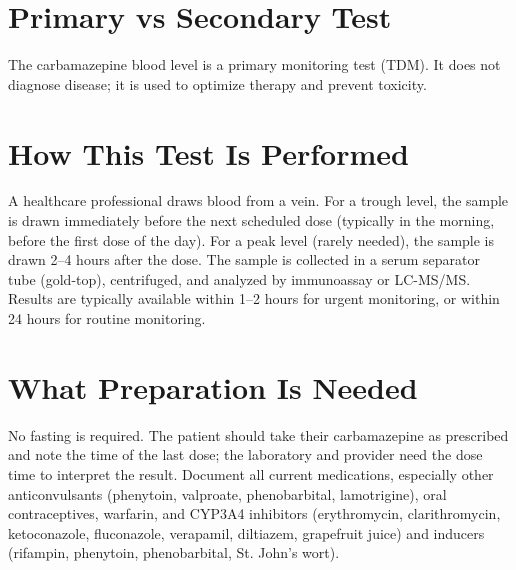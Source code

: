 \section*{Primary vs Secondary Test}
The carbamazepine blood level is a primary monitoring test (TDM). It does not diagnose disease; it is used to optimize therapy and prevent toxicity.

\section*{How This Test Is Performed}
A healthcare professional draws blood from a vein. For a trough level, the sample is drawn immediately before the next scheduled dose (typically in the morning, before the first dose of the day). For a peak level (rarely needed), the sample is drawn 2--4 hours after the dose. The sample is collected in a serum separator tube (gold-top), centrifuged, and analyzed by immunoassay or LC-MS/MS. Results are typically available within 1--2 hours for urgent monitoring, or within 24 hours for routine monitoring.

\section*{What Preparation Is Needed}
No fasting is required. The patient should take their carbamazepine as prescribed and note the time of the last dose; the laboratory and provider need the dose time to interpret the result. Document all current medications, especially other anticonvulsants (phenytoin, valproate, phenobarbital, lamotrigine), oral contraceptives, warfarin, and CYP3A4 inhibitors (erythromycin, clarithromycin, ketoconazole, fluconazole, verapamil, diltiazem, grapefruit juice) and inducers (rifampin, phenytoin, phenobarbital, St. John's wort).

